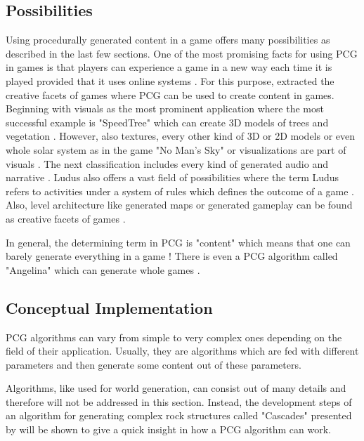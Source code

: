 \documentclass[MGS,Master,english]{twbook}%
\begin{document}
\subsection{Possibilities}
Using procedurally generated content in a game offers many possibilities as described in the last few sections. One of the most promising facts for using PCG in games is that players can experience a game in a new way each time it is played provided that it uses online systems \cite{pcg::gamasutra::tips}. For this purpose, \citep{pcg::computationalGameCreativity} extracted the creative facets of games where PCG can be used to create content in games. Beginning with visuals as the most prominent application where the most successful example is "SpeedTree" \cite{speedTree} which can create \ac{3D} models of trees and vegetation \cite{pcg::computationalGameCreativity}. However, also textures, every other kind of 3D or \ac{2D} models or even whole solar system as in the game "No Man's Sky" \cite{game::noMansSky} or visualizations are part of visuals \cite{pcg::computationalGameCreativity}. The next classification includes every kind of generated audio and narrative \cite{pcg::computationalGameCreativity}. Ludus also offers a vast field of possibilities where the term Ludus refers to activities under a system of rules which defines the outcome of a game \cite{pcg::computationalGameCreativity}. Also, level architecture like generated maps or generated gameplay can be found as creative facets of games \cite{pcg::computationalGameCreativity}.

In general, the determining term in PCG is "content" which means that one can barely generate everything in a game \cite{pcg::book}! There is even a PCG algorithm called "Angelina" which can generate whole games \cite{pcg::angelina}.

\subsection{Conceptual Implementation}
PCG algorithms can vary from simple to very complex ones depending on the field of their application. Usually, they are algorithms which are fed with different parameters and then generate some content out of these parameters.

Algorithms, like used for world generation, can consist out of many details and therefore will not be addressed in this section. Instead, the development steps of an algorithm for generating complex rock structures called "Cascades" presented by \cite{nvidia::cascades} will be shown to give a quick insight in how a PCG algorithm can work.
\end{document}
